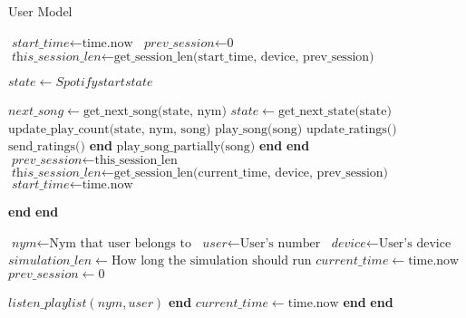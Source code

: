 \documentclass{article}
\begin{document}
\begin{algorithm}
\caption{User Model}\label{euclid}
\begin{algorithmic}[1]
\State $\textit{start\_time} \gets \text{time.now}$
\State $\textit{prev\_session} \gets \text{0}$
\State $\textit{this\_session\_len} \gets \text{get\_session\_len(start\_time, device, prev\_session)}$

\State $state \gets  Spotify start state$

    \State $next\_song \gets \text{get\_next\_song(state, nym)}$
    \State $state \gets \text{get\_next\_state(state)}$
        \State $\text{update\_play\_count(state, nym, song)}$
        \State $\text{play\_song(song)}$
        \State    $\text{update\_ratings()}$
        \State    $\text{send\_ratings()}$
    \EndIf
    \State \textbf{end}
        \State $\text{play\_song\_partially(song)}$
    \EndIf
    \State \textbf{end}
\EndWhile
\State \textbf{end}
\State $\textit{prev\_session} \gets \text{this\_session\_len}$
\State $\textit{this\_session\_len} \gets \text{get\_session\_len(current\_time, device, prev\_session)}$
\State $\textit{start\_time} \gets \text{time.now}$


\EndWhile
\State \textbf{end}
\EndProcedure
\State \textbf{end}

\State $\textit{nym} \gets \text{Nym that user belongs to}$
\State $\textit{user} \gets \text{User's number}$
\State $\textit{device} \gets \text{User's device}$
\State $simulation\_len \gets \text{How long the simulation should run}$
\State $current\_time \gets \text{time.now}$
\State $prev\_session \gets \text{0}$

    
\State    $listen\_playlist(nym, user)$
\EndIf
\State \textbf{end}
\State $current\_time \gets \text{time.now}$
\EndWhile
\State \textbf{end}
\EndProcedure
\State \textbf{end}
\end{algorithmic}
\end{algorithm}
\end{document}
